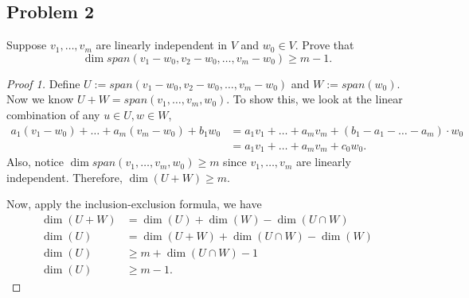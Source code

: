 \documentclass{article}
\begin{document}
\subsection*{Problem 2}
Suppose $v_1, \ldots, v_m$ are linearly independent in $V$ and $w_0\in V$.  
Prove that $$ \dim span (v_1 - w_0, v_2 - w_0, \dots, v_m - w_0) \ge m-1.$$
\begin{proof}[Proof 1]
    Define $U:=span (v_1 - w_0, v_2 - w_0, \dots, v_m - w_0)$ and $W:= span(w_0)$. Now we know 
    $U+W=span(v_1,\dots, v_m, w_0)$. 
    To show this, we look at the linear combination of any $u\in U, w\in W$,
    \begin{align*}
        a_1(v_1-w_0) + \dots + a_m(v_m-w_0) + b_1w_0 & = 
        a_1v_1 + \dots + a_mv_m + (b_1-a_1-\dots -a_m)\cdot w_0 \\
        & = a_1v_1 + \dots + a_mv_m + c_0w_0.
    \end{align*}
    Also, notice $\dim span(v_1, \dots, v_m, w_0) \ge m$ since $v_1, \dots, v_m$ are linearly 
    independent. Therefore, $\dim (U+W) \ge m$.

    Now, apply the inclusion-exclusion formula, we have 
    \begin{align*}
        \dim (U+W) & = \dim (U) + \dim (W) - \dim (U\cap W) \\
        \dim(U) & = \dim (U+W) + \dim (U\cap W) - \dim (W) \\
        \dim(U) & \ge m + \dim (U\cap W) - 1 \\
        \dim(U) & \ge m - 1.
    \end{align*}
\end{proof}
\bigbreak
\end{document}
